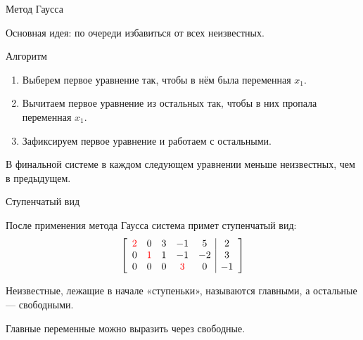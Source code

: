 \begin{frame}{Метод Гаусса}

Основная идея: по очереди избавиться от всех неизвестных.
\pause

\begin{block}{Алгоритм}
\begin{enumerate}
    \item Выберем первое уравнение так, чтобы в нём была переменная $x_1$.
    \pause
    \item Вычитаем первое уравнение из остальных так, чтобы в них пропала переменная $x_1$.
    \pause
    \item Зафиксируем первое уравнение и работаем с остальными. 
\end{enumerate}
\end{block}


\pause
В финальной системе в каждом следующем уравнении меньше неизвестных, чем в предыдущем.



\end{frame}



\begin{frame}{Ступенчатый вид}


После применения метода Гаусса система примет ступенчатый вид:
\[
\left[
\begin{array}{ccccc|c}
\textcolor{red}{2} & 0 & 3 & -1 & 5 & 2 \\
0 & \textcolor{red}{1} & 1 & -1 & -2 & 3 \\
0 & 0 & 0 & \textcolor{red}{3} & 0 & -1 \\
\end{array}
\right]
\]

\pause
Неизвестные, лежащие в начале «ступеньки», называются \alert{главными}, а остальные —
\alert{свободными}.

Главные переменные можно выразить через свободные.

\end{frame}





